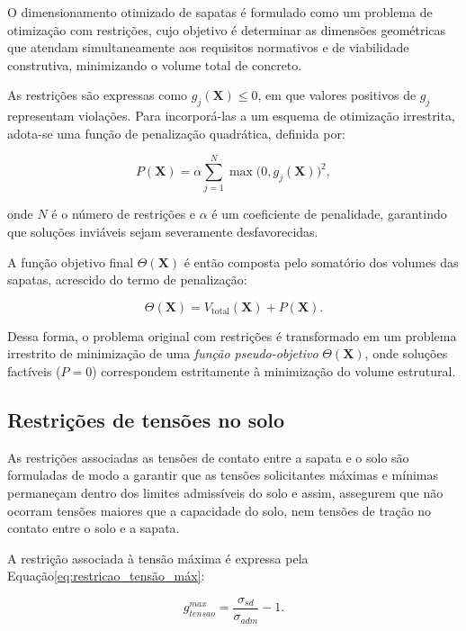 O dimensionamento otimizado de sapatas é formulado como um problema de 
otimização com restrições, cujo objetivo é determinar as dimensões 
geométricas que atendam simultaneamente aos requisitos normativos e de 
viabilidade construtiva, minimizando o volume total de concreto.

As restrições são expressas como \( g_j(\mathbf{X}) \le 0 \), em que 
valores positivos de \( g_j \) representam violações. Para incorporá-las 
a um esquema de otimização irrestrita, adota-se uma função de penalização 
quadrática, definida por:

\begin{equation}
P(\mathbf{X}) = \alpha \sum_{j=1}^{N} \max\bigl(0, g_j(\mathbf{X})\bigr)^2,
\label{eq:penalizacao}
\end{equation}

onde \( N \) é o número de restrições e \( \alpha \) é um coeficiente de 
penalidade, garantindo que soluções inviáveis sejam 
severamente desfavorecidas.

A função objetivo final \( \Theta(\mathbf{X}) \) é então composta pelo 
somatório dos volumes das sapatas, acrescido do termo de penalização:

\begin{equation}
\Theta(\mathbf{X}) = V_{\text{total}}(\mathbf{X}) + P(\mathbf{X}).
\label{eq:funcao_pseudo_objetivo}
\end{equation}

Dessa forma, o problema original com restrições é transformado em um 
problema irrestrito de minimização de uma \textit{função pseudo-objetivo} 
\( \Theta(\mathbf{X}) \), onde soluções factíveis (\( P = 0 \)) correspondem 
estritamente à minimização do volume estrutural.

\subsection{Restrições de tensões no solo}


As restrições associadas as tensões de contato entre a sapata e o solo são formuladas de modo a garantir que as tensões solicitantes máximas e mínimas permaneçam dentro dos limites admissíveis do solo e assim, assegurem que não ocorram tensões maiores que a capacidade do solo, nem tensões de tração no contato entre o solo e a sapata.

A restrição associada à tensão máxima é expressa pela Equação\eqref{eq:restricao_tensão_máx}:

\begin{equation}
g_{tensao}^{max} = \frac{\sigma_{sd}}{\sigma_{adm}} - 1.
    \label{eq:restricao_tensão_máx}
\end{equation}

